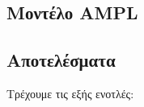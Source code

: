 \documentclass[
]{article}
\begin{document}
\hypertarget{mux3bfux3bdux3c4ux3adux3bbux3bf-ampl-1}{%
\subsection{Mοντέλο AMPL}\label{mux3bfux3bdux3c4ux3adux3bbux3bf-ampl-1}}

\hypertarget{ux3b1ux3c0ux3bfux3c4ux3b5ux3bbux3adux3c3ux3bcux3b1ux3c4ux3b1-1}{%
\subsection{Αποτελέσματα}\label{ux3b1ux3c0ux3bfux3c4ux3b5ux3bbux3adux3c3ux3bcux3b1ux3c4ux3b1-1}}

Τρέχουμε τις εξής ενοτλές:

 
  \providecommand{\huxb}[2]{\arrayrulecolor[RGB]{#1}\global\arrayrulewidth=#2pt}
  \providecommand{\huxvb}[2]{\color[RGB]{#1}\vrule width #2pt}
  \providecommand{\huxtpad}[1]{\rule{0pt}{#1}}
  \providecommand{\huxbpad}[1]{\rule[-#1]{0pt}{#1}}
\end{document}
